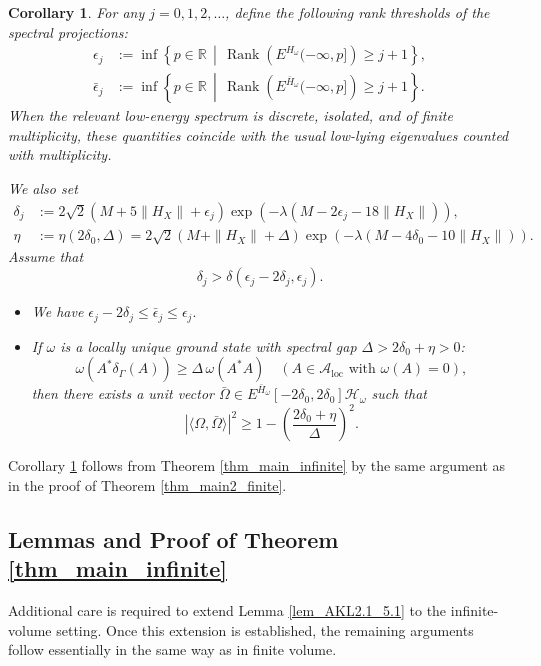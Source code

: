 \documentclass[11pt]{article}
\numberwithin{equation}{section}
\newtheorem{corollary}[theorem]{Corollary}
\begin{document}
\begin{corollary}\label{cor_main2_infinite}
For any $j=0,1,2,\ldots$, define the following rank thresholds of the spectral projections:
\begin{align*}
\epsilon_j
&:=\inf\left\{p\in\mathbb{R}\,\middle|\,
\operatorname{Rank}\left(E^{H_\omega}(-\infty,p]\right)\geq j+1\right\},\\
\bar{\epsilon}_j
&:=\inf\left\{p\in\mathbb{R}\,\middle|\,
\operatorname{Rank}\left(E^{\bar{H}_\omega}(-\infty,p]\right)\geq j+1\right\}.
\end{align*}
When the relevant low-energy spectrum is discrete, isolated, and of finite multiplicity, these quantities coincide with the usual low-lying eigenvalues counted with multiplicity.

We also set
\begin{align*}
\delta_j
&:=2\sqrt{2}(M+5\|H_X\|+\epsilon_j)
\exp(-\lambda(M-2\epsilon_j-18\|H_X\|)),\\
\eta
&:=\eta(2\delta_0,\Delta)
=2\sqrt{2}(M+\|H_X\|+\Delta)
\exp(-\lambda(M-4\delta_0-10\|H_X\|)).
\end{align*}
Assume that
\[
\delta_j>\delta(\epsilon_j-2\delta_j,\epsilon_j).
\]

\begin{itemize}
\item[(i)] We have
\(
\epsilon_j-2\delta_j\leq \bar{\epsilon}_j\leq \epsilon_j.
\)
\item[(ii)] If $\omega$ is a locally unique ground state with spectral gap $\Delta>2\delta_0+\eta>0$: 
\[
\omega(A^*\delta_\Gamma(A))\geq\Delta\,\omega(A^*A)
\quad(A\in\mathcal{A}_{\mathrm{loc}} \text{ with } \omega(A)=0),
\]
then there exists a unit vector $\bar{\Omega}\in
E^{\bar{H}_\omega}[-2\delta_0,2\delta_0]\mathcal H_\omega$
such that
\[
|\langle\Omega,\bar{\Omega}\rangle|^2\geq 1-\left(\frac{2\delta_0+\eta}{\Delta}\right)^2.
\]
\end{itemize}
\end{corollary}

Corollary \ref{cor_main2_infinite} follows from Theorem \ref{thm_main_infinite} by the same argument as in the proof of Theorem \ref{thm_main2_finite}.

\subsection{Lemmas and Proof of Theorem \ref{thm_main_infinite}}
Additional care is required to extend Lemma \ref{lem_AKL2.1_5.1} to the infinite-volume setting. Once this extension is established, the remaining arguments follow essentially in the same way as in finite volume.
\end{document}
